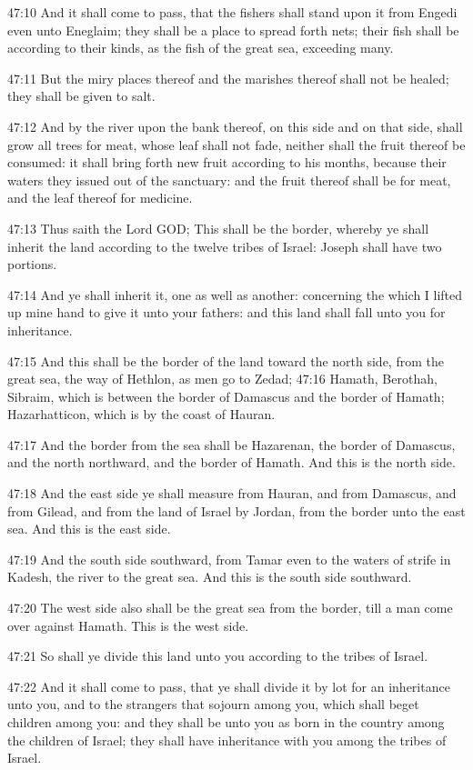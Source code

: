 47:10 And it shall come to pass, that the fishers shall stand upon it from Engedi even unto Eneglaim; they shall be a place to spread forth nets; their fish shall be according to their kinds, as the fish of the great sea, exceeding many.

47:11 But the miry places thereof and the marishes thereof shall not be healed; they shall be given to salt.

47:12 And by the river upon the bank thereof, on this side and on that side, shall grow all trees for meat, whose leaf shall not fade, neither shall the fruit thereof be consumed: it shall bring forth new fruit according to his months, because their waters they issued out of the sanctuary: and the fruit thereof shall be for meat, and the leaf thereof for medicine.

47:13 Thus saith the Lord GOD; This shall be the border, whereby ye shall inherit the land according to the twelve tribes of Israel: Joseph shall have two portions.

47:14 And ye shall inherit it, one as well as another: concerning the which I lifted up mine hand to give it unto your fathers: and this land shall fall unto you for inheritance.

47:15 And this shall be the border of the land toward the north side, from the great sea, the way of Hethlon, as men go to Zedad; 47:16 Hamath, Berothah, Sibraim, which is between the border of Damascus and the border of Hamath; Hazarhatticon, which is by the coast of Hauran.

47:17 And the border from the sea shall be Hazarenan, the border of Damascus, and the north northward, and the border of Hamath. And this is the north side.

47:18 And the east side ye shall measure from Hauran, and from Damascus, and from Gilead, and from the land of Israel by Jordan, from the border unto the east sea. And this is the east side.

47:19 And the south side southward, from Tamar even to the waters of strife in Kadesh, the river to the great sea. And this is the south side southward.

47:20 The west side also shall be the great sea from the border, till a man come over against Hamath. This is the west side.

47:21 So shall ye divide this land unto you according to the tribes of Israel.

47:22 And it shall come to pass, that ye shall divide it by lot for an inheritance unto you, and to the strangers that sojourn among you, which shall beget children among you: and they shall be unto you as born in the country among the children of Israel; they shall have inheritance with you among the tribes of Israel.

